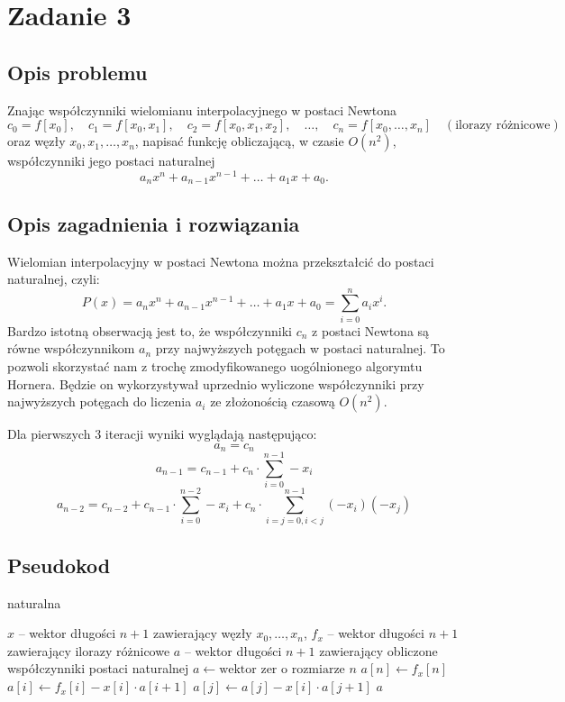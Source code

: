 \documentclass{article}
\begin{document}
\section{Zadanie 3}
\subsection{Opis problemu}
Znając współczynniki wielomianu interpolacyjnego w postaci Newtona
\[
c_0 = f[x_0], \quad c_1 = f[x_0, x_1], \quad c_2 = f[x_0, x_1, x_2], \quad \dots, \quad c_n = f[x_0, \dots, x_n] \quad (\text{ilorazy różnicowe})
\]
oraz węzły \(x_0, x_1, \dots, x_n\), napisać funkcję obliczającą, w czasie \(O(n^2)\), współczynniki jego postaci naturalnej
\[
a_n x^n + a_{n-1} x^{n-1} + \dots + a_1 x + a_0.
\]

\subsection{Opis zagadnienia i rozwiązania}
Wielomian interpolacyjny w postaci Newtona można przekształcić do postaci naturalnej, czyli:
\[
P(x) = a_n x^n + a_{n-1} x^{n-1} + \dots + a_1 x + a_0 = \sum_{i=0}^n a_i x^i.
\]
Bardzo istotną obserwacją jest to, że współczynniki $c_n$ z postaci Newtona są równe współczynnikom $a_n$ przy najwyższych potęgach w postaci naturalnej.
To pozwoli skorzystać nam z trochę zmodyfikowanego uogólnionego algorymtu Hornera.
Będzie on wykorzystywał uprzednio wyliczone współczynniki przy najwyższych potęgach do liczenia $a_i$ ze złożonością czasową \( O(n^2) \).

Dla pierwszych 3 iteracji wyniki wyglądają następująco:
$$a_n = c_n$$
$$a_{n-1} = c_{n-1} + c_n \cdot \sum_{i=0}^{n-1}-x_i$$
$$a_{n-2} = c_{n-2} + c_{n-1} \cdot \sum_{i=0}^{n-2}-x_i + c_{n} \cdot \sum_{i=j=0, i<j}^{n-1}(-x_i) (-x_j)$$

\subsection{Pseudokod}
\begin{algorithm}[H]
\caption{naturalna}
\begin{algorithmic}[1]
\Require $x$ -- wektor długości $n + 1$ zawierający węzły $x_0, \dots, x_n$, $f_x$ -- wektor długości $n + 1$ zawierający ilorazy różnicowe
\Ensure $a$ -- wektor długości $n + 1$ zawierający obliczone współczynniki postaci naturalnej
\State $a \gets \text{wektor zer o rozmiarze } n$
\State $a[n] \gets f_x[n]$
    \State $a[i] \gets f_x[i] - x[i] \cdot a[i+1]$
        \State $a[j] \gets a[j] - x[i] \cdot a[j+1]$
    \EndFor
\EndFor
\State \Return $a$
\end{algorithmic}
\end{algorithm}
\end{document}
